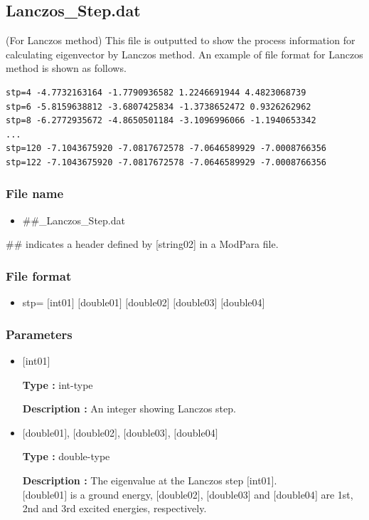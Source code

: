 \newpage
\subsection{Lanczos\_Step.dat}
(For Lanczos method) 
This file is outputted to show the process information for calculating eigenvector by Lanczos method.
An example of file format for Lanczos method is shown as follows.\\
\begin{minipage}{15cm}
\begin{screen}
\begin{verbatim}
stp=4 -4.7732163164 -1.7790936582 1.2246691944 4.4823068739
stp=6 -5.8159638812 -3.6807425834 -1.3738652472 0.9326262962
stp=8 -6.2772935672 -4.8650501184 -3.1096996066 -1.1940653342
...
stp=120 -7.1043675920 -7.0817672578 -7.0646589929 -7.0008766356
stp=122 -7.1043675920 -7.0817672578 -7.0646589929 -7.0008766356
\end{verbatim}
\end{screen}
\end{minipage}

\subsubsection{File name}
 \begin{itemize}
   \item  \#\#\_Lanczos\_Step.dat
  \end{itemize}
 \#\# indicates a header defined by [string02] in a ModPara file.

\subsubsection{File format}
 \begin{itemize}
   \item stp= $[$int01$]$ $[$double01$]$ $[$double02$]$ $[$double03$]$ $[$double04$]$
  \end{itemize}
\subsubsection{Parameters}
 \begin{itemize}

  \item  $[$int01$]$
  
 {\bf Type :} int-type

{\bf Description :} An integer showing Lanczos step.
 
  \item  $[$double01$]$, $[$double02$]$, $[$double03$]$, $[$double04$]$

 {\bf Type :} double-type 

{\bf Description :} The eigenvalue at the Lanczos step $[$int01$]$.\\
$[$double01$]$ is a ground energy, $[$double02$]$, $[$double03$]$ and $[$double04$]$ are 1st, 2nd and 3rd excited energies, respectively.

 \end{itemize}

